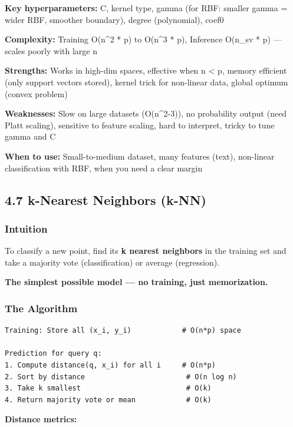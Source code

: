 \documentclass[11pt]{article}
\begin{document}
\textbf{Key hyperparameters:} C, kernel type, gamma (for RBF: smaller gamma = wider RBF, smoother boundary), degree (polynomial), coef0

\textbf{Complexity:} Training O(n\^{}2 * p) to O(n\^{}3 * p), Inference O(n\_sv * p) --- scales poorly with large n

\textbf{Strengths:} Works in high-dim spaces, effective when n \textless{} p, memory efficient (only support vectors stored), kernel trick for non-linear data, global optimum (convex problem)

\textbf{Weaknesses:} Slow on large datasets (O(n\^{}2-3)), no probability output (need Platt scaling), sensitive to feature scaling, hard to interpret, tricky to tune gamma and C

\textbf{When to use:} Small-to-medium dataset, many features (text), non-linear classification with RBF, when you need a clear margin

\subsection{4.7 k-Nearest Neighbors (k-NN)}\label{47-k-nearest-neighbors-k-nn}

\subsubsection{Intuition}\label{intuition-6}

To classify a new point, find its \textbf{k nearest neighbors} in the training set and take a majority vote (classification) or average (regression).

\textbf{The simplest possible model --- no training, just memorization.}

\subsubsection{The Algorithm}\label{the-algorithm}

\setcodelang{}

\begin{verbatim}
Training: Store all (x_i, y_i)            # O(n*p) space

Prediction for query q:
1. Compute distance(q, x_i) for all i     # O(n*p)
2. Sort by distance                        # O(n log n)
3. Take k smallest                         # O(k)
4. Return majority vote or mean            # O(k)
\end{verbatim}

\textbf{Distance metrics:}
\end{document}
